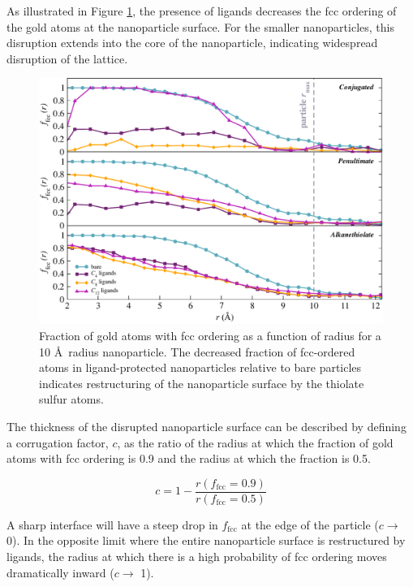 As illustrated in Figure \ref{fig:Corrugation}, the presence of
ligands decreases the fcc ordering of the gold atoms at the
nanoparticle surface. For the smaller nanoparticles, this disruption
extends into the core of the nanoparticle, indicating widespread
disruption of the lattice.

\begin{figure}
  \includegraphics[width=\linewidth]{figures/fcc}
  \caption{Fraction of gold atoms with fcc ordering as a function of
    radius for a 10 \AA\ radius nanoparticle. The decreased fraction
    of fcc-ordered atoms in ligand-protected nanoparticles relative to
    bare particles indicates restructuring of the nanoparticle surface
    by the thiolate sulfur atoms.}
  \label{fig:Corrugation}
\end{figure}

The thickness of the disrupted nanoparticle surface can be described by
defining a corrugation factor, $c$, as the ratio of the radius at
which the fraction of gold atoms with fcc ordering is 0.9 and the
radius at which the fraction is 0.5.

\begin{equation}
	c = 1 - \frac{r(f_\mathrm{fcc} = 0.9)}{r(f_\mathrm{fcc} = 0.5)}
\end{equation}

A sharp interface will have a steep drop in $f_\mathrm{fcc}$ at the
edge of the particle ($c \rightarrow$ 0). In the opposite limit where
the entire nanoparticle surface is restructured by ligands, the radius
at which there is a high probability of fcc ordering moves
dramatically inward ($c \rightarrow$ 1).

